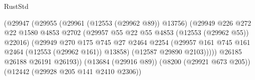 \begin{lexlean}{RustStd}
\begin{coremodule}
                                                    (@29947
                                                      (@29955
                                                        (@29961 (@12553 (@29962 @89)) @13756)
                                                        (@29949
                                                          @226
                                                          @272
                                                          @22
                                                          @1580
                                                          @4853
                                                          @2702
                                                          (@29957
                                                            @55
                                                            @22
                                                            @55
                                                            @4853
                                                            (@12553 (@29962 @55))
                                                            @22016)
                                                          (@29949
                                                            @270
                                                            @175
                                                            @745
                                                            @27
                                                            @2464
                                                            @2254
                                                            (@29957
                                                              @161
                                                              @745
                                                              @161
                                                              @2464
                                                              (@12553 (@29962 @161))
                                                              @13858)
                                                            (@12587 @29890 @2103)))))
                                                    @26185
                                                    @26188
                                                    @26191
                                                    @26193))
                                                (@13684 (@29916 @89))
                                                (@8200 (@29921 @673 @205))
                                                (@12442 (@29928 @205 @141 @2410 @2306))

\end{coremodule}
\end{lexlean}
